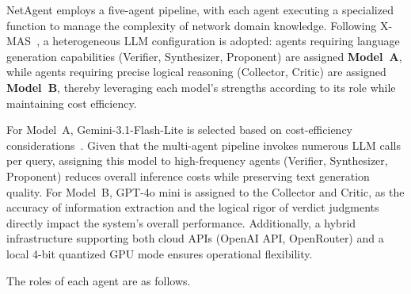 NetAgent employs a five-agent pipeline, with each agent executing a specialized function to manage the complexity of network domain knowledge.
Following X-MAS~\cite{ye2025xmas}, a heterogeneous LLM configuration is adopted: agents requiring language generation capabilities (Verifier, Synthesizer, Proponent) are assigned \textbf{Model~A}, while agents requiring precise logical reasoning (Collector, Critic) are assigned \textbf{Model~B}, thereby leveraging each model's strengths according to its role while maintaining cost efficiency.

For Model~A, Gemini-3.1-Flash-Lite is selected based on cost-efficiency considerations~\cite{gemini31_flash_lite_2026}.
Given that the multi-agent pipeline invokes numerous LLM calls per query, assigning this model to high-frequency agents (Verifier, Synthesizer, Proponent) reduces overall inference costs while preserving text generation quality.
For Model~B, GPT-4o mini is assigned to the Collector and Critic, as the accuracy of information extraction and the logical rigor of verdict judgments directly impact the system's overall performance.
Additionally, a hybrid infrastructure supporting both cloud APIs (OpenAI API, OpenRouter) and a local 4-bit quantized GPU mode ensures operational flexibility.

The roles of each agent are as follows.




